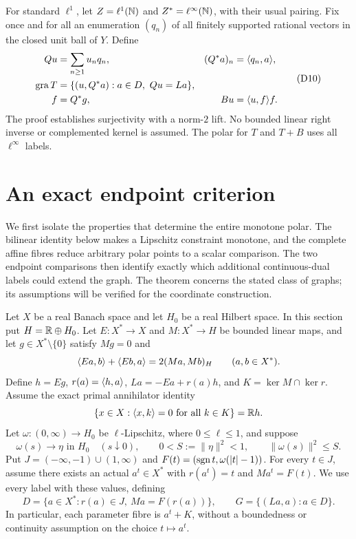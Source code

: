 For standard $\ell^1$, let $Z=\ell^1(\mathbb N)$ and $Z^*=\ell^\infty(\mathbb N)$,
with their usual pairing. Fix once and for all an enumeration $(q_n)$ of
all finitely supported rational vectors in the closed unit ball of $Y$.
Define
\begin{equation}
\begin{aligned}
Qu&=\sum_{n\ge1}u_nq_n,& (Q^*a)_n&=\langle q_n,a\rangle,\\
\operatorname{gra} T&=\{(u,Q^*a):a\in D,\ Qu=La\},\\
f&=Q^*g,& Bu&=\langle u,f\rangle f.
\end{aligned}
\tag{D10}\label{eq:D10}
\end{equation}
The proof establishes surjectivity with a norm-$2$ lift. No bounded linear
right inverse or complemented kernel is assumed. The polar for $T$ and
$T+B$ uses all $\ell^\infty$ labels.


\section{An exact endpoint criterion}
\label{sec:endpoint-criterion}
We first isolate the properties that determine the entire monotone polar.
The bilinear identity below makes a Lipschitz constraint monotone, and
the complete affine fibres reduce arbitrary polar points to a scalar
comparison. The two endpoint comparisons then identify exactly which
additional continuous-dual labels could extend the graph. The theorem
concerns the stated class of graphs; its assumptions will be verified
for the coordinate construction.

Let $X$ be a real Banach space and let $H_0$ be a real Hilbert space.
In this section put $H=\mathbb R\oplus H_0$. Let
$E:X^*\to X$ and $M:X^*\to H$ be bounded linear maps, and let
$g\in X^*\setminus\{0\}$ satisfy $Mg=0$ and
\begin{equation}
\langle Ea,b\rangle+\langle Eb,a\rangle=2(Ma,Mb)_H
\qquad(a,b\in X^*).
\label{eq:abs-bilinear}
\end{equation}
Define $h=Eg$, $r(a)=\langle h,a\rangle$, $La=-Ea+r(a)h$, and
$K=\ker M\cap\ker r$. Assume the exact primal annihilator identity
\begin{equation}
\{x\in X:\langle x,k\rangle=0\ \hbox{for all }k\in K\}=\mathbb R h.
\label{eq:abs-annihilator}
\end{equation}
Let $\omega:(0,\infty)\to H_0$ be $\ell$-Lipschitz, where
$0\le\ell\le1$, and suppose
\begin{equation}
\omega(s)\longrightarrow\eta\text{ in }H_0\quad(s\downarrow0),
\qquad 0<S:=\|\eta\|^2<1,\qquad \|\omega(s)\|^2\le S.
\label{eq:abs-tail}
\end{equation}
Put $J=(-\infty,-1)\cup(1,\infty)$ and
$F(t)=(\operatorname{sgn} t,\omega(|t|-1))$. For every $t\in J$, assume
there exists an actual $a^t\in X^*$ with $r(a^t)=t$ and
$Ma^t=F(t)$. We use every label with these values, defining
\begin{equation}
D=\{a\in X^*:r(a)\in J,\ Ma=F(r(a))\},\qquad
G=\{(La,a):a\in D\}.
\label{eq:abs-full-graph}
\end{equation}
In particular, each parameter fibre is $a^t+K$, without a boundedness
or continuity assumption on the choice $t\mapsto a^t$.

